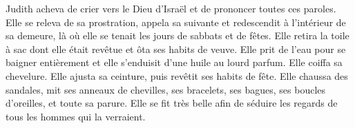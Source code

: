 Judith acheva de crier vers le Dieu d'Israël et de prononcer toutes ces paroles.
Elle se releva de sa prostration, appela sa suivante
	et redescendit à l'intérieur de sa demeure,
	là où elle se tenait les jours de sabbats et de fêtes.
Elle retira la toile à sac dont elle était revêtue et ôta ses habits de veuve.
Elle prit de l'eau pour se baigner entièrement
	et elle s'enduisit d'une huile au lourd parfum.
Elle coiffa sa chevelure.
	Elle ajusta sa ceinture, puis revêtit ses habits de fête.
Elle chaussa des sandales, mit ses anneaux de chevilles,
	ses bracelets, ses bagues, ses boucles d'oreilles, et toute sa parure.
Elle se fit très belle afin de séduire les regards de tous les hommes qui la verraient.
